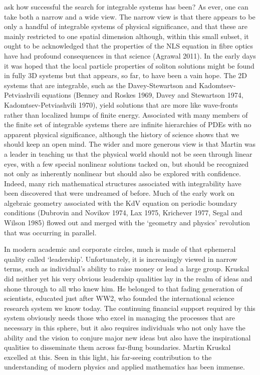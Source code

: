 \documentclass[11pt]{article}
\begin{document}
ask how successful the search for integrable systems has been? As ever, one can take both a narrow and a wide view. The 
narrow view is that there appears to be only a handful of integrable systems of physical significance, and that these are 
mainly restricted to one spatial 
dimension although, within this small subset, it ought to be acknowledged that the properties of the NLS equation in fibre 
optics have had profound consequences in that science (Agrawal 2011). In the early days it was hoped that the local particle 
properties of soliton solutions might be found in fully 3D systems but that appears, so far, to have been a vain hope. The 
2D systems that are integrable, such as the Davey-Stewartson and Kadomtsev-Petviashvili equations (Benney and Roskes
1969, Davey and Stewartson 1974, Kadomtsev-Petviashvili 1970), yield solutions that are more like wave-fronts rather than 
localized humps of finite energy. Associated with many members of the finite set of integrable systems there are infinite 
hierarchies of PDEs with no apparent physical significance, although the history of science shows that we should keep an 
open mind. The wider and more generous view is that Martin was a leader in teaching us that the physical world should 
not be seen through linear eyes, with a few special nonlinear solutions tacked on, but should be recognized not only as 
inherently nonlinear but should also be explored with confidence. Indeed, many rich mathematical structures associated 
with integrability have been discovered that were undreamed of before. Much of the early work on algebraic geometry 
associated with the KdV equation on periodic boundary conditions (Dubrovin and Novikov 1974, Lax 1975, Krichever 
1977, Segal and Wilson 1985) flowed out and merged with the `geometry and physics' revolution that was occurring in 
parallel. 
\par\smallskip%
In modern academic and corporate circles, much is made of that ephemeral quality called `leadership'. Unfortunately, it is 
increasingly viewed in narrow terms, such as individual's ability to raise money or lead a large group. Kruskal did neither 
yet his very obvious leadership qualities lay in the realm of ideas and shone through to all who knew him. He belonged to 
that fading generation of scientists, educated just after WW2, who founded the international science research system we 
know today. The continuing financial support required by this system obviously needs those who excel in managing the 
processes that are necessary in this sphere, but it also requires individuals who not only have the ability and the vision to 
conjure major new ideas but also have the inspirational qualities to disseminate them across far-flung boundaries. Martin 
Kruskal excelled at this. Seen in this light, his far-seeing contribution to the understanding of modern physics and applied 
mathematics has been immense.  
\end{document}
